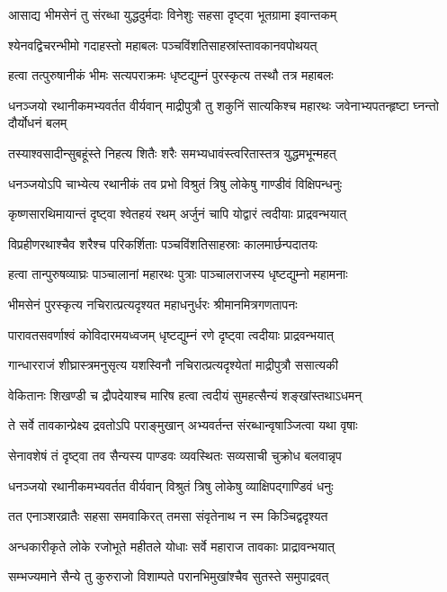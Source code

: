 \twolineshloka
{आसाद्य भीमसेनं तु संरब्धा युद्धदुर्मदाः}
{विनेशुः सहसा दृष्ट्वा भूतग्रामा इवान्तकम्}


\twolineshloka
{श्येनवद्विचरन्भीमो गदाहस्तो महाबलः}
{पञ्चविंशतिसाहस्रांस्तावकानवपोथयत्}


\twolineshloka
{हत्वा तत्पुरुषानीकं भीमः सत्यपराक्रमः}
{धृष्टद्युम्नं पुरस्कृत्य तस्थौ तत्र महाबलः}


\threelineshloka
{धनञ्जयो रथानीकमभ्यवर्तत वीर्यवान्}
{माद्रीपुत्रौ तु शकुनिं सात्यकिश्च महारथः}
{जवेनाभ्यपतन्हृष्टा घ्नन्तो दौर्योधनं बलम्}


\twolineshloka
{तस्याश्वसादीन्सुबहूंस्ते निहत्य शितैः शरैः}
{समभ्यधावंस्त्वरितास्तत्र युद्धमभून्महत्}


\twolineshloka
{धनञ्जयोऽपि चाभ्येत्य रथानीकं तव प्रभो}
{विश्रुतं त्रिषु लोकेषु गाण्डीवं विक्षिपन्धनुः}


\twolineshloka
{कृष्णसारथिमायान्तं दृष्ट्वा श्वेतहयं रथम्}
{अर्जुनं चापि योद्वारं त्वदीयाः प्राद्रवन्भयात्}


\twolineshloka
{विप्रहीणरथाश्चैव शरैश्च परिकर्शिताः}
{पञ्चविंशतिसाहस्राः कालमार्छन्पदातयः}


\twolineshloka
{हत्वा तान्पुरुषव्याघ्रः पाञ्चालानां महारथः}
{पुत्राः पाञ्चालराजस्य धृष्टद्युम्नो महामनाः}


\twolineshloka
{भीमसेनं पुरस्कृत्य नचिरात्प्रत्यदृश्यत}
{महाधनुर्धरः श्रीमानमित्रगणतापनः}


\twolineshloka
{पारावतसवर्णाश्वं कोविदारमयध्वजम्}
{धृष्टद्युम्नं रणे दृष्ट्वा त्वदीयाः प्राद्रवन्भयात्}


\twolineshloka
{गान्धारराजं शीघ्रास्त्रमनुसृत्य यशस्विनौ}
{नचिरात्प्रत्यदृश्येतां माद्रीपुत्रौ ससात्यकी}


\twolineshloka
{वेकितानः शिखण्डी च द्रौपदेयाश्च मारिष}
{हत्वा त्वदीयं सुमहत्सैन्यं शङ्खांस्तथाऽधमन्}


\twolineshloka
{ते सर्वे तावकान्प्रेक्ष्य द्रवतोऽपि पराङ्मुखान्}
{अभ्यवर्तन्त संरब्धान्वृषाञ्जित्वा यथा वृषाः}


\twolineshloka
{सेनावशेषं तं दृष्ट्वा तव सैन्यस्य पाण्डवः}
{व्यवस्थितः सव्यसाची चुक्रोध बलवान्नृप}


\twolineshloka
{धनञ्जयो रथानीकमभ्यवर्तत वीर्यवान्}
{विश्रुतं त्रिषु लोकेषु व्याक्षिपद्गाण्डिवं धनुः}


\twolineshloka
{तत एनाञ्शरव्रातैः सहसा समवाकिरत्}
{तमसा संवृतेनाथ न स्म किञ्चिद्वदृश्यत}


\twolineshloka
{अन्धकारीकृते लोके रजोभूते महीतले}
{योधाः सर्वे महाराज तावकाः प्राद्रावन्भयात्}


\twolineshloka
{सम्भज्यमाने सैन्ये तु कुरुराजो विशाम्पते}
{परानभिमुखांश्चैव सुतस्ते समुपाद्रवत्}


